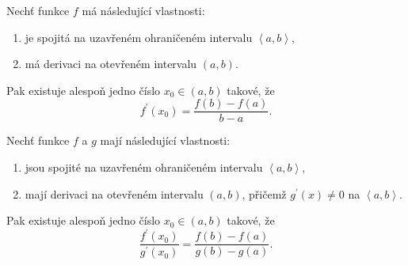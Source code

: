 \begin{veta}
Nechť funkce $f$ má následující vlastnosti:
\begin{enumerate}[$i.$]
\item je spojitá na uzavřeném ohraničeném intervalu $\left<  a,b \right> $,
\item má derivaci na otevřeném intervalu $(a,b)$.
\end{enumerate}
Pak existuje alespoň jedno číslo $x_0\in (a,b)$ takové, že
$$f^\prime(x_0)=\frac{f(b)-f(a)}{b-a}.$$
\end{veta}

\begin{veta}
Nechť funkce $f$ a $g$ mají následující vlastnosti:
\begin{enumerate}[$i.$]
\item jsou spojité na uzavřeném ohraničeném intervalu $\left<  a,b \right> $,
\item mají derivaci na otevřeném intervalu $(a,b)$, přičemž $g^\prime(x)\ne 0$ na $\left<  a,b \right> $.
\end{enumerate}
Pak existuje alespoň jedno číslo $x_0\in (a,b)$ takové, že
$$\frac{f^\prime(x_0)}{g^\prime(x_0)}=\frac{f(b)-f(a)}{g(b)-g(a)}.$$
\end{veta}
